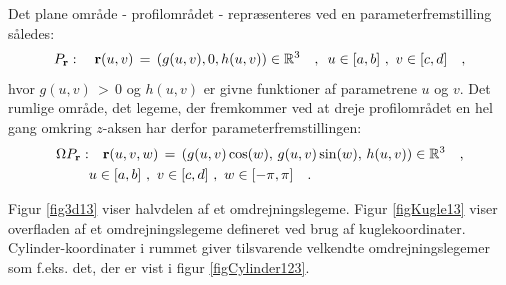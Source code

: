 Det plane område - profilområdet - repræsenteres
ved en parameterfremstilling således:
\begin{equation}
P_{\bf r} : \quad {\bf r}(u,v) \, = \, \left(g(u,v), 0, h(u,v)\right)
\in \mathbb{R}^3 \quad , \, \, \,  u \in [a,b] \, \,
, \, \, v \in [c, d] \quad,
\end{equation}
hvor $g(u,v)\, > \, 0 $  og $h(u,v)$ er givne
funktioner af parametrene $u$ og $v$. Det rumlige
område, det legeme, der fremkommer ved at dreje
profilområdet en hel gang omkring $z$-aksen har
derfor parameterfremstillingen:
\begin{equation} \label{eqOmegaP}
\begin{aligned}
\Omega P_{\bf r} : &\quad {\bf r}(u,v,w) \, = \, \left(g(u,v)\cos(w), \, g(u,v)\sin(w),
\,
h(u,v)\right) \in \mathbb{R}^3 \quad ,  \\
 &u \in [a,b] \, \,
, \, \, v \in [c, d]  \, \,
, \, \, w \in [-\pi, \pi] \quad.
\end{aligned}
\end{equation}


Figur \ref{fig3d13} viser halvdelen af et omdrejningslegeme. Figur
\ref{figKugle13} viser overfladen af et omdrejningslegeme defineret
ved brug af kuglekoordinater. Cylinder-koordinater i rummet giver
tilsvarende velkendte omdrejningslegemer som f.eks. det, der er vist
i figur \ref{figCylinder123}.

